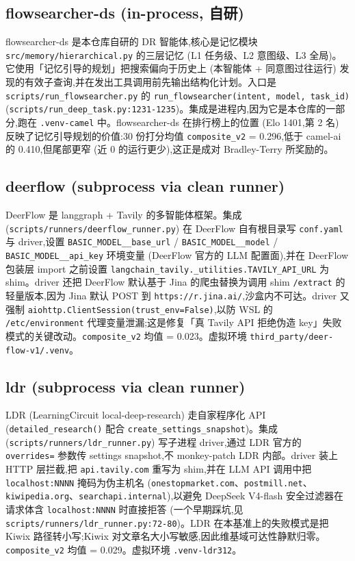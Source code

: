 \documentclass[UTF8,a4paper,12pt,oneside]{ctexart}
\begin{document}
\subsection{flowsearcher-ds (in-process, 自研)}

flowsearcher-ds 是本仓库自研的 DR 智能体,核心是记忆模块 \texttt{src/memory/hierarchical.py} 的三层记忆 (L1 任务级、L2 意图级、L3 全局)。它使用「记忆引导的规划」把搜索偏向于历史上 (本智能体 + 同意图过往运行) 发现的有效子查询,并在发出工具调用前先输出结构化计划。入口是 \texttt{scripts/run\_flowsearcher.py} 的 \texttt{run\_flowsearcher(intent, model, task\_id)} (\texttt{scripts/run\_deep\_task.py:1231-1235})。集成是进程内,因为它是本仓库的一部分,跑在 \texttt{.venv-camel} 中。flowsearcher-ds 在排行榜上的位置 (Elo 1401,第 2 名) 反映了记忆引导规划的价值:30 份打分均值 \texttt{composite\_v2} = 0.296,低于 camel-ai 的 0.410,但尾部更窄 (近 0 的运行更少),这正是成对 Bradley-Terry 所奖励的。

\subsection{deerflow (subprocess via clean runner)}

DeerFlow 是 langgraph + Tavily 的多智能体框架。集成 (\texttt{scripts/runners/deerflow\_runner.py}) 在 DeerFlow 自有根目录写 \texttt{conf.yaml} 与 driver,设置 \texttt{BASIC\_MODEL\_\_base\_url} / \texttt{BASIC\_MODEL\_\_model} / \texttt{BASIC\_MODEL\_\_api\_key} 环境变量 (DeerFlow 官方的 LLM 配置面),并在 DeerFlow 包装层 import 之前设置 \texttt{langchain\_tavily.\_utilities.TAVILY\_API\_URL} 为 shim。driver 还把 DeerFlow 默认基于 Jina 的爬虫替换为调用 shim \texttt{/extract} 的轻量版本,因为 Jina 默认 POST 到 \texttt{https://r.jina.ai/},沙盒内不可达。driver 又强制 \texttt{aiohttp.ClientSession(trust\_env=False)},以防 WSL 的 \texttt{/etc/environment} 代理变量泄漏;这是修复「真 Tavily API 拒绝伪造 key」失败模式的关键改动。\texttt{composite\_v2} 均值 = 0.023。虚拟环境 \texttt{third\_party/deer-flow-v1/.venv}。

\subsection{ldr (subprocess via clean runner)}

LDR (LearningCircuit local-deep-research) 走自家程序化 API (\texttt{detailed\_research()} 配合 \texttt{create\_settings\_snapshot})。集成 (\texttt{scripts/runners/ldr\_runner.py}) 写子进程 driver,通过 LDR 官方的 \texttt{overrides=} 参数传 settings snapshot,不 monkey-patch LDR 内部。driver 装上 HTTP 层拦截,把 \texttt{api.tavily.com} 重写为 shim,并在 LLM API 调用中把 \texttt{localhost:NNNN} 掩码为伪主机名 (\texttt{onestopmarket.com}、\texttt{postmill.net}、\texttt{kiwipedia.org}、\texttt{searchapi.internal}),以避免 DeepSeek V4-flash 安全过滤器在请求体含 \texttt{localhost:NNNN} 时直接拒答 (一个早期踩坑,见 \texttt{scripts/runners/ldr\_runner.py:72-80})。LDR 在本基准上的失败模式是把 Kiwix 路径转小写;Kiwix 对文章名大小写敏感,因此维基域可达性静默归零。\texttt{composite\_v2} 均值 = 0.029。虚拟环境 \texttt{.venv-ldr312}。
\end{document}

